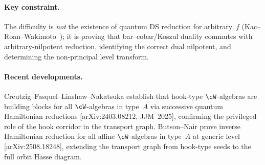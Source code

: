 \paragraph{Key constraint.}
The difficulty is \emph{not} the existence of quantum DS
reduction for arbitrary~$f$ (Kac--Roan--Wakimoto~\cite{KRW});
it is proving that bar--cobar/Koszul duality commutes with
arbitrary-nilpotent reduction, identifying the correct dual
nilpotent, and determining the non-principal level transform.

\paragraph{Recent developments.}
Creutzig--Fasquel--Linshaw--Nakatsuka establish that hook-type
$\cW$-algebras are building blocks for all $\cW$-algebras in
type~$A$ via successive quantum Hamiltonian reductions
[arXiv:2403.08212, JJM~2025], confirming the privileged role of
the hook corridor in the transport graph.
Butson--Nair prove inverse Hamiltonian reduction for all
affine $\cW$-algebras in type~$A$ at generic level
[arXiv:2508.18248], extending the transport graph from hook-type
seeds to the full orbit Hasse diagram.

